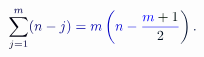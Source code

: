 \documentclass[12pt]{article}
\begin{document}
\makeatletter
\renewcommand*{\@textcolor}[3]{%
  \protect\leavevmode
  \begingroup
    \color#1{#2}#3%
  \endgroup
}
\makeatother
\begin{displaymath}
\mathcolor[RGB]{0,0,15}{\sum} _ { \mathcolor[RGB]{0,0,30}{j} \mathcolor[RGB]{0,0,45}{=} \mathcolor[RGB]{0,0,60}{1} } ^ { \mathcolor[RGB]{0,0,75}{m} } \mathcolor[RGB]{0,0,90}{(} \mathcolor[RGB]{0,0,105}{n} \mathcolor[RGB]{0,0,120}{-} \mathcolor[RGB]{0,0,135}{j} \mathcolor[RGB]{0,0,150}{)} \mathcolor[RGB]{0,0,165}{=} \mathcolor[RGB]{0,0,180}{m} \mathcolor[RGB]{0,0,195}{\left(} \mathcolor[RGB]{0,0,210}{n} \mathcolor[RGB]{0,0,225}{-} \mathcolor[RGB]{0,0,240}{\frac { \mathcolor[RGB]{0,0,255}{m} \mathcolor[RGB]{0,15,0}{+} \mathcolor[RGB]{0,15,15}{1} } { \mathcolor[RGB]{0,15,30}{2} } } \mathcolor[RGB]{0,15,45}{\right)} \mathcolor[RGB]{0,15,60}{.}
\end{displaymath}
\end{document}
